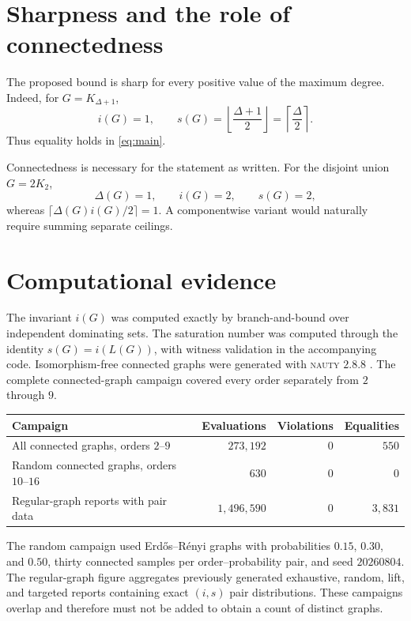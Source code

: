 \documentclass[11pt]{article}
\newcommand{\sat}{s}
\begin{document}
\section{Sharpness and the role of connectedness}
The proposed bound is sharp for every positive value of the maximum degree. Indeed, for $G=K_{\Delta+1}$,
\[
 i(G)=1,\qquad
 \sat(G)=\left\lfloor\frac{\Delta+1}{2}\right\rfloor
       =\left\lceil\frac{\Delta}{2}\right\rceil.
\]
Thus equality holds in \eqref{eq:main}.

Connectedness is necessary for the statement as written. For the disjoint union $G=2K_2$,
\[
 \Delta(G)=1,\qquad i(G)=2,\qquad \sat(G)=2,
\]
whereas $\lceil\Delta(G)i(G)/2\rceil=1$. A componentwise variant would naturally require summing separate ceilings.

\section{Computational evidence}
The invariant $i(G)$ was computed exactly by branch-and-bound over independent dominating sets. The saturation number was computed through the identity $\sat(G)=i(L(G))$, with witness validation in the accompanying code. Isomorphism-free connected graphs were generated with \textsc{nauty} $2.8.8$ \cite{mckay2014}. The complete connected-graph campaign covered every order separately from $2$ through $9$.

\begin{center}
\begin{tabular}{lrrr}
\toprule
Campaign & Evaluations & Violations & Equalities \\
\midrule
All connected graphs, orders $2$--$9$ & $273{,}192$ & $0$ & $550$ \\
Random connected graphs, orders $10$--$16$ & $630$ & $0$ & $0$ \\
Regular-graph reports with pair data & $1{,}496{,}590$ & $0$ & $3{,}831$ \\
\bottomrule
\end{tabular}
\end{center}

The random campaign used Erd\H{o}s--R\'enyi graphs with probabilities $0.15$, $0.30$, and $0.50$, thirty connected samples per order--probability pair, and seed $20260804$. The regular-graph figure aggregates previously generated exhaustive, random, lift, and targeted reports containing exact $(i,\sat)$ pair distributions. These campaigns overlap and therefore must not be added to obtain a count of distinct graphs.
\end{document}
